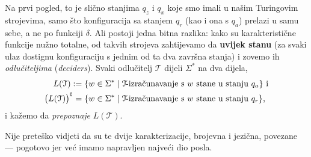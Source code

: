 Na prvi pogled, to je slično stanjima $q_z$ i $q_x$ koje smo imali u našim Turingovim strojevima, samo što konfiguracija sa stanjem $q_r$ (kao i ona s $q_a$) prelazi u samu sebe, a ne po funkciji $\delta$. Ali postoji jedna bitna razlika: kako su karakteristične funkcije nužno totalne, od takvih strojeva zahtijevamo da \textbf{uvijek stanu} (za svaki ulaz dostignu konfiguraciju s jednim od ta dva završna stanja) i zovemo ih \emph{odlučiteljima} (\emph{deciders}). Svaki odlučitelj $\mathcal T$ dijeli $\Sigma^*$ na dva dijela,
\begin{align}
    L(\mathcal T):=\{w\in\Sigma^*&\mid\text{$\mathcal T$\!-izračunavanje s $w$ stane u stanju $q_a$}\}
    \text{ i}\\ \bigl(L(\mathcal T)\big)\sp{{\scriptscriptstyle\complement}}=\{w\in\Sigma^*&\mid\text{$\mathcal T$\!-izračunavanje s $w$ stane u stanju $q_r$}\}\text,
\end{align} i kažemo da \emph{prepoznaje} $L(\mathcal T)$.

Nije preteško vidjeti da su te dvije karakterizacije, brojevna i jezična, povezane --- pogotovo jer već imamo napravljen najveći dio posla.

